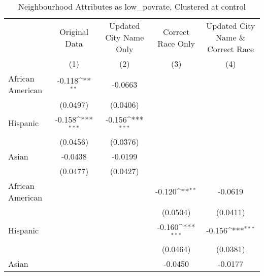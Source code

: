 \documentclass{article}
\begin{document}
\begin{landscape}
\begin{table}[htbp]\centering
\def\sym#1{\ifmmode^{#1}\else\(^{#1}\)\fi}
\caption{Neighbourhood Attributes as low\_povrate, Clustered at control}
\begin{tabular}{l*{4}{c}}
\toprule
                         &\multicolumn{1}{c}{Original Data}&\multicolumn{1}{c}{Updated City Name Only}&\multicolumn{1}{c}{Correct Race Only}&\multicolumn{1}{c}{Updated City Name \& Correct Race}\\\cmidrule(lr){2-2}\cmidrule(lr){3-3}\cmidrule(lr){4-4}\cmidrule(lr){5-5}
                         &\multicolumn{1}{c}{(1)}         &\multicolumn{1}{c}{(2)}         &\multicolumn{1}{c}{(3)}         &\multicolumn{1}{c}{(4)}         \\
\midrule
African American         &      -0.118\sym{**} &     -0.0663         &                     &                     \\
                         &    (0.0497)         &    (0.0406)         &                     &                     \\
\addlinespace
Hispanic                 &      -0.158\sym{***}&      -0.156\sym{***}&                     &                     \\
                         &    (0.0456)         &    (0.0376)         &                     &                     \\
\addlinespace
Asian                    &     -0.0438         &     -0.0199         &                     &                     \\
                         &    (0.0477)         &    (0.0427)         &                     &                     \\
\addlinespace
African American         &                     &                     &      -0.120\sym{**} &     -0.0619         \\
                         &                     &                     &    (0.0504)         &    (0.0411)         \\
\addlinespace
Hispanic                 &                     &                     &      -0.160\sym{***}&      -0.156\sym{***}\\
                         &                     &                     &    (0.0464)         &    (0.0381)         \\
\addlinespace
Asian                    &                     &                     &     -0.0450         &     -0.0177         \\

\end{tabular}
\end{table}
\end{landscape}
\end{document}
